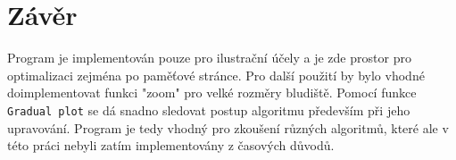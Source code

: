 \documentclass[12pt]{article}
\begin{document}
\section{Závěr}
Program je implementován pouze pro ilustrační účely a je zde prostor pro optimalizaci zejména po paměťové stránce. Pro další použití by bylo vhodné doimplementovat funkci "zoom" pro velké rozměry bludiště. Pomocí funkce \texttt{Gradual plot} se dá snadno sledovat postup algoritmu především při jeho upravování. Program je tedy vhodný pro zkoušení různých algoritmů, které ale v této práci nebyli zatím implementovány z časových důvodů.
\end{document}
